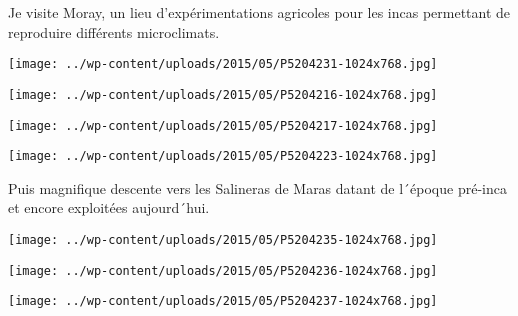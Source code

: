  

 Je visite Moray, un lieu d'expérimentations agricoles pour les incas permettant de reproduire différents microclimats. 

 

\begin{center} \texttt{[image: ../wp-content/uploads/2015/05/P5204231-1024x768.jpg]} \end{center}

 

 

\begin{center} \texttt{[image: ../wp-content/uploads/2015/05/P5204216-1024x768.jpg]} \end{center}

 

 

\begin{center} \texttt{[image: ../wp-content/uploads/2015/05/P5204217-1024x768.jpg]} \end{center}

 

 

\begin{center} \texttt{[image: ../wp-content/uploads/2015/05/P5204223-1024x768.jpg]} \end{center}

 

 Puis magnifique descente vers les Salineras de Maras datant de l´époque pré-inca et encore exploitées aujourd´hui. 

 

\begin{center} \texttt{[image: ../wp-content/uploads/2015/05/P5204235-1024x768.jpg]} \end{center}

 

 

\begin{center} \texttt{[image: ../wp-content/uploads/2015/05/P5204236-1024x768.jpg]} \end{center}

 

 

\begin{center} \texttt{[image: ../wp-content/uploads/2015/05/P5204237-1024x768.jpg]} \end{center}

 

